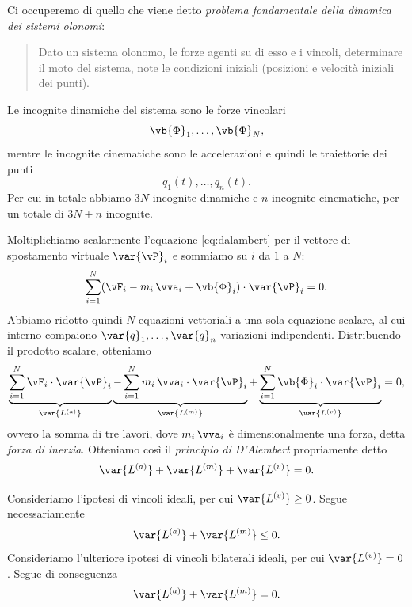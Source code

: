 Ci occuperemo di quello che viene detto \emph{problema fondamentale della dinamica dei sistemi olonomi}:
\begin{quote}
    Dato un sistema olonomo, le forze agenti su di esso e i vincoli, determinare il moto del sistema, note le condizioni iniziali (posizioni e velocità iniziali dei punti).
\end{quote}
Le incognite dinamiche del sistema sono le forze vincolari
\begin{equation*}
    \vb{\Phi}_1,\dots, \vb{\Phi}_N,
\end{equation*}
mentre le incognite cinematiche sono le accelerazioni e quindi le traiettorie dei punti
\begin{equation*}
    q_1(t), \dots, q_n(t).
\end{equation*}
Per cui in totale abbiamo $3N$ incognite dinamiche e $n$ incognite cinematiche, per un totale di $3N + n$ incognite.

Moltiplichiamo scalarmente l'equazione \eqref{eq:dalambert} per il vettore di spostamento virtuale $\var{\vP}_i$ e sommiamo su $i$ da $1$ a $N$:
\begin{equation*}
    \sum_{i=1}^N (\vF_i - m_i\,\vva_i + \vb{\Phi}_i)\cdot \var{\vP}_i = 0.
\end{equation*}
Abbiamo ridotto quindi $N$ equazioni vettoriali a una sola equazione scalare, al cui interno compaiono $\var{q}_1, \dots, \var{q}_n$ variazioni indipendenti.
Distribuendo il prodotto scalare, otteniamo
\begin{equation*}
    \underbrace{\sum_{i=1}^N \vF_i\cdot \var{\vP}_i}_{\var{L^{(a)}}}  \underbrace{-\sum_{i=1}^N m_i\,\vva_i\cdot \var{\vP}_i}_{\var{L^{(m)}}} + \underbrace{\sum_{i=1}^N \vb{\Phi}_i\cdot \var{\vP}_i}_{\var{L^{(v)}}} = 0,
\end{equation*}
ovvero la somma di tre lavori, dove $m_i\,\vva_i$ è dimensionalmente una forza, detta \emph{forza di inerzia}. Otteniamo così il \emph{principio di D'Alembert} propriamente detto
\begin{equation*}
    \var{L^{(a)}} + \var{L^{(m)}} + \var{L^{(v)}} = 0.
\end{equation*}

Consideriamo l'ipotesi di vincoli ideali, per cui $\var{L^{(v)}} \geq 0$.  Segue necessariamente 
\begin{equation*}
    \var{L^{(a)}} + \var{L^{(m)}} \leq 0.
\end{equation*}
Consideriamo l'ulteriore ipotesi di vincoli bilaterali ideali, per cui $\var{L^{(v)}} = 0$. Segue di conseguenza
\begin{equation*}
    \var{L^{(a)}} + \var{L^{(m)}} = 0.
\end{equation*}


